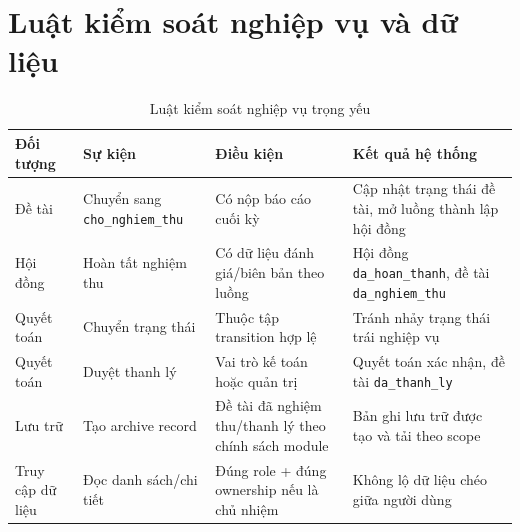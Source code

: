 \documentclass[12pt,a4paper]{report}
\begin{document}
\section{Luật kiểm soát nghiệp vụ và dữ liệu}
\begin{table}[H]
\centering
\small
\begin{tabular}{|L{2.5cm}|L{3.0cm}|L{2.8cm}|L{4.1cm}|}
\hline
\textbf{Đối tượng} & \textbf{Sự kiện} & \textbf{Điều kiện} & \textbf{Kết quả hệ thống} \\ \hline
Đề tài & Chuyển sang \texttt{cho\_nghiem\_thu} & Có nộp báo cáo cuối kỳ & Cập nhật trạng thái đề tài, mở luồng thành lập hội đồng \\ \hline
Hội đồng & Hoàn tất nghiệm thu & Có dữ liệu đánh giá/biên bản theo luồng & Hội đồng \texttt{da\_hoan\_thanh}, đề tài \texttt{da\_nghiem\_thu} \\ \hline
Quyết toán & Chuyển trạng thái & Thuộc tập transition hợp lệ & Tránh nhảy trạng thái trái nghiệp vụ \\ \hline
Quyết toán & Duyệt thanh lý & Vai trò kế toán hoặc quản trị & Quyết toán xác nhận, đề tài \texttt{da\_thanh\_ly} \\ \hline
Lưu trữ & Tạo archive record & Đề tài đã nghiệm thu/thanh lý theo chính sách module & Bản ghi lưu trữ được tạo và tải theo scope \\ \hline
Truy cập dữ liệu & Đọc danh sách/chi tiết & Đúng role + đúng ownership nếu là chủ nhiệm & Không lộ dữ liệu chéo giữa người dùng \\ \hline
\end{tabular}
\caption{Luật kiểm soát nghiệp vụ trọng yếu}
\end{table}
\end{document}

